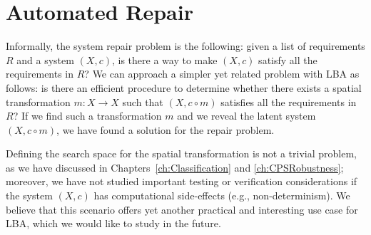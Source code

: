 \section{Automated Repair}
Informally, the system repair problem is the following: given a list of requirements $R$ and a system $(X,c)$, is there a way to make $(X,c)$ satisfy all the requirements in $R$? We can approach a simpler yet related problem with LBA as follows: is there an efficient procedure to determine whether there exists a spatial transformation $m\colon X\rightarrow X$ such that $(X,c\circ m)$ satisfies all the requirements in $R$? If we find such a transformation $m$ and we reveal the latent system $(X,c\circ m)$, we have found a solution for the repair problem. 

Defining the search space for the spatial transformation is not a trivial problem, as we have discussed in Chapters~\ref{ch:Classification} and \ref{ch:CPSRobustness}; moreover, we have not studied important testing or verification considerations if the system $(X,c)$ has computational side-effects (e.g., non-determinism). We believe that this scenario offers yet another practical and interesting use case for LBA, which we would like to study in the future. %

